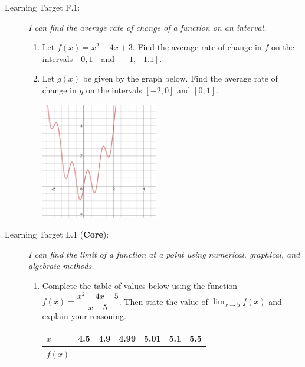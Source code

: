\documentclass[11 pt]{article}
\begin{document}
\begin{description}

\item[Learning Target F.1: ] \textit{I can find the average rate of change of a function on an interval.}

\begin{enumerate}
    \item Let $f(x) = x^2 - 4x + 3$. Find the average rate of change in $f$ on the intervals $[0,1]$ and $[-1, -1.1]$. 
    \item Let $g(x)$ be given by the graph below. Find the average rate of change in $g$ on the intervals $[-2,0]$ and $[0,1]$. 
    \begin{center}
        \includegraphics[width=2in]{cp1sample-f1.png}
    \end{center}
\end{enumerate}

\vfill \eject

\item[Learning Target L.1 (\textbf{Core}): ] \textit{I can find the limit of a function at a point using numerical, graphical, and algebraic methods.} 

\begin{enumerate}
    \item Complete the table of values below using the function $f(x) = \dfrac{x^2 - 4x - 5}{x-5}$. Then state the value of $\lim_{x \to 5} f(x)$ and explain your reasoning. 
    
        \begin{tabular}{l|l|l|l|l|l|l}
        $x$    & 4.5 & 4.9 & 4.99 & 5.01 & 5.1 & 5.5 \\ \hline
        $f(x)$ &     &     &      &      &     &    
        \end{tabular}


\end{enumerate}
\end{description}
\end{document}
